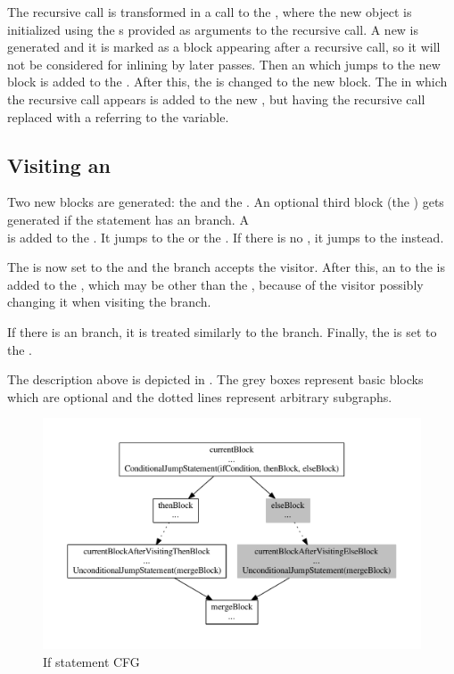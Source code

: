 The recursive call is transformed in a  call to the , where the new  object is
initialized using the s provided as arguments to the recursive call. A new  is generated
and it is marked as a block appearing after a recursive call, so it will not be considered for inlining by later passes.
Then an  which jumps to the new block is added to the . After this,
the  is changed to the new block. The  in which the recursive call appears is
added to the new , but having the recursive call replaced with a  referring to
the  variable.

\subsection{Visiting an }

Two new blocks are generated: the  and the . An optional third block (the
) gets generated if the  statement has an  branch. A\\
 is added to the . It jumps to the  or the
. If there is no , it jumps to the  instead.

The  is now set to the  and the  branch accepts the visitor. After this,
an  to the  is added to the , which may be other
than the , because of the visitor possibly changing it when visiting the  branch.

If there is an  branch, it is treated similarly to the  branch. Finally, the 
is set to the .

The description above is depicted in . The grey boxes represent basic blocks
which are optional and the dotted lines represent arbitrary subgraphs.

\begin{figure}
    \centering
    \includegraphics[width=\textwidth]{src/graph/graph.pdf}
    \caption{If statement CFG\label{img:if-statement}}
\end{figure}

